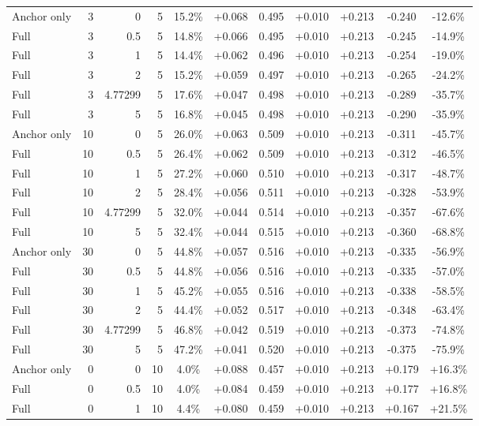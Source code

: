 \begin{table}[htbp]
\begin{tabular}{lrrrccccccc}
Anchor only & 3 & 0 & 5 & 15.2\% & +0.068 & 0.495 & +0.010 & +0.213 & -0.240 & -12.6\% \\
Full & 3 & 0.5 & 5 & 14.8\% & +0.066 & 0.495 & +0.010 & +0.213 & -0.245 & -14.9\% \\
Full & 3 & 1 & 5 & 14.4\% & +0.062 & 0.496 & +0.010 & +0.213 & -0.254 & -19.0\% \\
Full & 3 & 2 & 5 & 15.2\% & +0.059 & 0.497 & +0.010 & +0.213 & -0.265 & -24.2\% \\
Full & 3 & 4.77299 & 5 & 17.6\% & +0.047 & 0.498 & +0.010 & +0.213 & -0.289 & -35.7\% \\
Full & 3 & 5 & 5 & 16.8\% & +0.045 & 0.498 & +0.010 & +0.213 & -0.290 & -35.9\% \\
Anchor only & 10 & 0 & 5 & 26.0\% & +0.063 & 0.509 & +0.010 & +0.213 & -0.311 & -45.7\% \\
Full & 10 & 0.5 & 5 & 26.4\% & +0.062 & 0.509 & +0.010 & +0.213 & -0.312 & -46.5\% \\
Full & 10 & 1 & 5 & 27.2\% & +0.060 & 0.510 & +0.010 & +0.213 & -0.317 & -48.7\% \\
Full & 10 & 2 & 5 & 28.4\% & +0.056 & 0.511 & +0.010 & +0.213 & -0.328 & -53.9\% \\
Full & 10 & 4.77299 & 5 & 32.0\% & +0.044 & 0.514 & +0.010 & +0.213 & -0.357 & -67.6\% \\
Full & 10 & 5 & 5 & 32.4\% & +0.044 & 0.515 & +0.010 & +0.213 & -0.360 & -68.8\% \\
Anchor only & 30 & 0 & 5 & 44.8\% & +0.057 & 0.516 & +0.010 & +0.213 & -0.335 & -56.9\% \\
Full & 30 & 0.5 & 5 & 44.8\% & +0.056 & 0.516 & +0.010 & +0.213 & -0.335 & -57.0\% \\
Full & 30 & 1 & 5 & 45.2\% & +0.055 & 0.516 & +0.010 & +0.213 & -0.338 & -58.5\% \\
Full & 30 & 2 & 5 & 44.4\% & +0.052 & 0.517 & +0.010 & +0.213 & -0.348 & -63.4\% \\
Full & 30 & 4.77299 & 5 & 46.8\% & +0.042 & 0.519 & +0.010 & +0.213 & -0.373 & -74.8\% \\
Full & 30 & 5 & 5 & 47.2\% & +0.041 & 0.520 & +0.010 & +0.213 & -0.375 & -75.9\% \\
Anchor only & 0 & 0 & 10 & 4.0\% & +0.088 & 0.457 & +0.010 & +0.213 & +0.179 & +16.3\% \\
Full & 0 & 0.5 & 10 & 4.0\% & +0.084 & 0.459 & +0.010 & +0.213 & +0.177 & +16.8\% \\
Full & 0 & 1 & 10 & 4.4\% & +0.080 & 0.459 & +0.010 & +0.213 & +0.167 & +21.5\% \\

\end{tabular}
\end{table}

